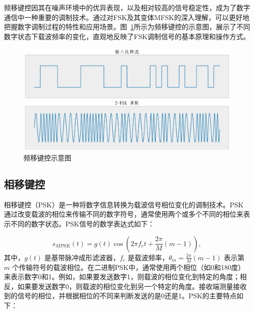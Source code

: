 频移键控因其在噪声环境中的优异表现，以及相对较高的信号稳定性，成为了数字通信中一种重要的调制技术。通过对FSK及其变体MFSK的深入理解，可以更好地把握数字调制过程的特性和应用场景。图~\ref{fig:FSK}所示为频移键控的示意图，展示了不同数字状态下载波频率的变化，直观地反映了FSK调制信号的基本原理和操作方式。

\begin{figure}[htbp]
    \centering
    \includegraphics[width=\textwidth]{Image/fsk.pdf}
    \caption{频移键控示意图}
    \label{fig:FSK}
\end{figure}

\subsection{相移键控}\label{sec:background}

相移键控（PSK）是一种将数字信息转换为载波信号相位变化的调制技术。PSK通过改变载波的相位来传输不同的数字符号，通常使用两个或多个不同的相位来表示不同的数字状态。PSK信号的数学表达式如下：

\begin{equation}
    s_{MPSK}(t) = g(t) \cos(2\pi f_c t + \frac{2\pi}{M} (m-1)),
\end{equation}
其中，\( g(t) \) 是基带脉冲成形滤波器，\( f_c \) 是载波频率，\( \theta_m = \frac{2\pi}{M} (m-1) \) 表示第 \( m \) 个传输符号的载波相位。在二进制PSK中，通常使用两个相位（如0和180度）来表示数字0和1。例如，如果要发送数字1，则载波的相位变化到特定的角度；相反，如果要发送数字0，则载波的相位变化到另一个特定的角度。接收端测量接收到的信号的相位，并根据相位的不同来判断发送的是0还是1。PSK的主要特点如下：


